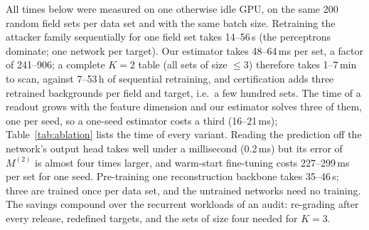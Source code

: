 All times below were measured on one otherwise idle GPU, on the same 200 random field sets per data set and with the same batch size. Retraining the attacker family sequentially for one field set takes 14--56\,s (the perceptrons dominate; one network per target). Our estimator takes 48--64\,ms per set, a factor of 241--906; a complete $K=2$ table (all sets of size $\le3$) therefore takes 1--7\,min to scan, against 7--53\,h of sequential retraining, and certification adds three retrained backgrounds per field and target, i.e.\ a few hundred sets. The time of a readout grows with the feature dimension and our estimator solves three of them, one per seed, so a one-seed estimator costs a third (16--21\,ms); Table~\ref{tab:ablation} lists the time of every variant. Reading the prediction off the network's output head takes well under a millisecond (0.2\,ms) but its error of $M^{(2)}$ is almost four times larger, and warm-start fine-tuning costs 227--299\,ms per set for one seed. Pre-training one reconstruction backbone takes 35--46\,s; three are trained once per data set, and the untrained networks need no training. The savings compound over the recurrent workloads of an audit: re-grading after every release, redefined targets, and the sets of size four needed for $K=3$.
